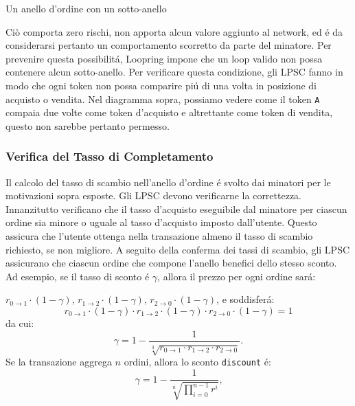 \documentclass[UTF8,nofonts]{article}
\makeatletter
\newenvironment{figurehere}
 {\def\@captype{figure}}
 {}
\makeatother
\begin{document}
\begin{multicols}{2}
\begin{center}
\begin{figurehere}
\caption{Un anello d'ordine con un sotto-anello}
\label{fig:subring}
\end{figurehere}
\end{center}

Ciò comporta zero rischi, non apporta alcun valore aggiunto al network, ed \'e da considerarsi pertanto un comportamento scorretto da parte del minatore.  Per prevenire questa possibilit\'a, Loopring impone che un loop valido non possa contenere alcun sotto-anello.  Per verificare questa condizione, gli LPSC fanno in modo che ogni token non possa comparire pi\'u di una volta in posizione di acquisto o vendita. Nel diagramma sopra, possiamo vedere come il token \verb|A| compaia due volte  come token d'acquisto e altrettante come token di vendita, questo non sarebbe pertanto permesso.


\subsubsection{Verifica del Tasso di Completamento\label{sec:fill_rate_check}}


Il calcolo del tasso di scambio nell'anello d'ordine \'e svolto dai minatori per le motivazioni sopra esposte. Gli LPSC devono verificarne la correttezza. Innanzitutto verificano che il tasso d'acquisto eseguibile dal minatore per ciascun ordine sia minore o uguale al tasso d'acquisto imposto dall'utente. Questo assicura che l'utente ottenga nella transazione almeno il tasso di scambio richiesto, se non migliore.
A seguito della conferma dei tassi di scambio, gli LPSC assicurano che ciascun ordine che compone l'anello benefici dello stesso sconto. Ad esempio, se il tasso di sconto \'e $\gamma$, allora il prezzo per ogni ordine sar\'a:

$r_{0\rightarrow 1} \cdot (1-\gamma)$, $r_{1\rightarrow 2} \cdot (1-\gamma)$, $r_{2 \rightarrow 0} \cdot (1-\gamma)$, e soddisfer\'a:
\begin{equation}
r_{0\rightarrow 1} \cdot (1-\gamma)\cdot r_{1\rightarrow 2} \cdot (1-\gamma) \cdot r_{2 \rightarrow 0} \cdot (1-\gamma) = 1
\end{equation}
da cui:
\begin{equation}
\gamma = 1- \frac{1}{\sqrt[3]{r_{0\rightarrow 1} \cdot r_{1\rightarrow 2} \cdot r_{2\rightarrow 0}}}\text{.}
\end{equation}
Se la transazione aggrega $n$ ordini, allora lo sconto \texttt{discount} \'e:
\begin{equation}
\gamma = 1- \frac{1}{\sqrt[n]{\prod_{i=0}^{n-1} r^i}} \text{,}
\end{equation}


\end{multicols}
\end{document}

